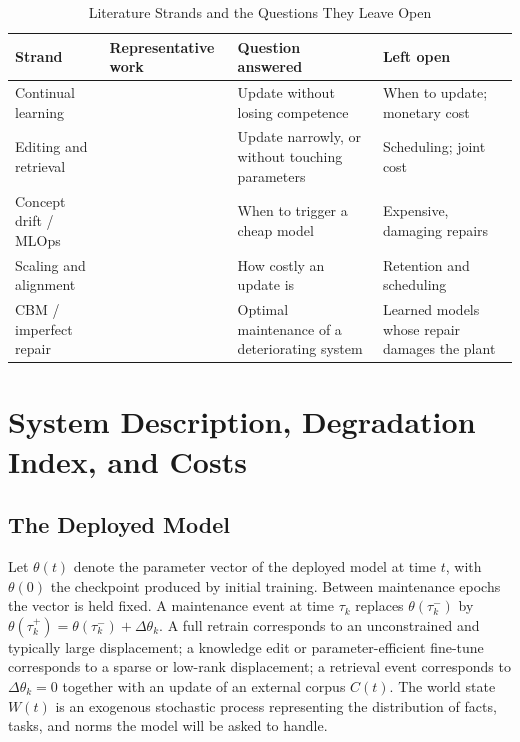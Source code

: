 \documentclass[journal]{IEEEtran}
\begin{document}
\begin{table}[t]
\caption{Literature Strands and the Questions They Leave Open}\label{tab:gap}
\centering
\footnotesize
\setlength{\tabcolsep}{3pt}\begin{tabular}{p{}p{}p{}p{}}
\toprule
Strand & Representative work & Question answered & Left open\\
\midrule
Continual learning & \cite{kirkpatrick2017,luo2023} & Update without losing competence & When to update; monetary cost\\
Editing and retrieval & \cite{gao2023,wang2024} & Update narrowly, or without touching parameters & Scheduling; joint cost\\
Concept drift / MLOps & \cite{lu2019,mahadevan2023,beytur2025} & When to trigger a cheap model & Expensive, damaging repairs\\
Scaling and alignment & \cite{kaplan2020,ouyang2022} & How costly an update is & Retention and scheduling\\
CBM / imperfect repair & \cite{wang2002,pham1996,dejonge2020} & Optimal maintenance of a deteriorating system & Learned models whose repair damages the plant\\
\bottomrule
\end{tabular}
\end{table}

\section{System Description, Degradation Index, and Costs}\label{sec:model}
\subsection{The Deployed Model}
Let $\theta(t)$ denote the parameter vector of the deployed model at time $t$, with $\theta(0)$ the checkpoint produced by initial training. Between maintenance epochs the vector is held fixed. A maintenance event at time $\tau_k$ replaces $\theta(\tau_k^-)$ by $\theta(\tau_k^+)=\theta(\tau_k^-)+\Delta\theta_k$. A full retrain corresponds to an unconstrained and typically large displacement; a knowledge edit or parameter-efficient fine-tune corresponds to a sparse or low-rank displacement; a retrieval event corresponds to $\Delta\theta_k=0$ together with an update of an external corpus $C(t)$. The world state $W(t)$ is an exogenous stochastic process representing the distribution of facts, tasks, and norms the model will be asked to handle.
\end{document}

